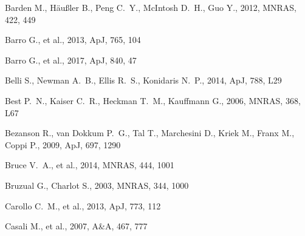 \documentclass[a4paper,fleqn,usenatbib,useAMS]{mnras}
\begin{document}




%

\begin{thebibliography}{}



Barden M., H{\"a}u{\ss}ler B., Peng C.~Y., McIntosh D.~H., Guo Y., 2012, 
MNRAS, 422, 449 


Barro G., et al., 2013, ApJ, 765, 104 

Barro G., et al., 2017, ApJ, 840, 47 




 Belli S., Newman A.~B., Ellis R.~S., Konidaris N.~P., 2014, ApJ, 788, L29 



Best P.~N., Kaiser C.~R., Heckman T.~M., Kauffmann G., 2006, MNRAS, 368, 
L67 



 Bezanson R., van Dokkum P.~G., Tal T., 
Marchesini D., Kriek M., Franx M., Coppi P., 2009, ApJ, 697, 1290 


Bruce V.~A., et al., 2014, MNRAS, 444, 1001 




 Bruzual G., Charlot S., 2003, MNRAS, 344, 1000 


 Carollo C.~M., et al., 2013, ApJ, 773, 112 


 Casali M., et al., 2007, A\&A, 467, 777 





\end{thebibliography}
\end{document}

